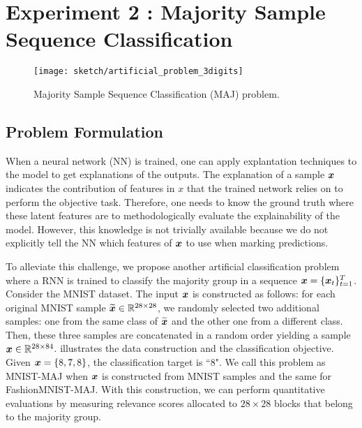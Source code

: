 \section{Experiment 2 : Majority Sample Sequence Classification} \label{sec:exp2}
   
 \begin{figure}[!htb]
\centering
\texttt{[image: sketch/artificial\_problem\_3digits]}
\caption{Majority Sample Sequence Classification (MAJ) problem.} 
\label{fig:artificial_problem_3digits}
\end{figure}

\subsection{Problem Formulation} \label{sec:exp2_prob_formulate}
When a neural network (NN) is trained, one can apply explantation techniques to the model to get explanations of the outputs.  The explanation of a sample $\boldsymbol{x}$ indicates the contribution of features in $x$ that the trained network relies on to perform the objective task.  Therefore, one needs to know the ground truth where these latent features are to methodologically evaluate the explainability of the model.  However, this knowledge is not trivially available because we do not explicitly tell the NN which features of $\boldsymbol{x}$ to use when marking predictions.


To alleviate this challenge, we propose another artificial classification problem where a RNN is trained to classify  the majority group in a sequence $\boldsymbol{x} = \{ \boldsymbol{x}_t \}_{t=1}^{T}$. Consider  the MNIST dataset. The input $\boldsymbol{x}$ is constructed as follows: for each original MNIST sample $\widetilde{\boldsymbol{x}} \in \mathbb{R}^{28 \times 28}$, we randomly selected two additional samples: one from the same class of $\widetilde{\boldsymbol{x}}$ and the other one from a different class. Then, these three samples are concatenated in a random order yielding a sample $\boldsymbol{x} \in \mathbb{R}^{28 \times 84}$.  \addfigure{\ref{fig:artificial_problem_3digits}} illustrates the data construction and the classification objective. Given $\boldsymbol{x} = \{ 8, 7, 8\}$, the classification target is ``8".  We call this problem as MNIST-MAJ when $\boldsymbol{x}$ is constructed from MNIST samples and the same for FashionMNIST-MAJ. With this construction, we can perform quantitative evaluations by measuring relevance scores allocated to $28\times28$ blocks that belong to the majority group.
%


